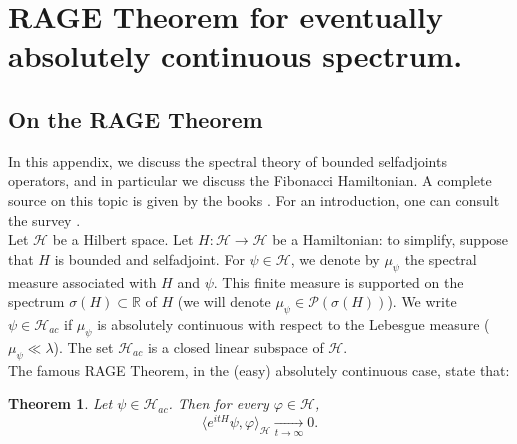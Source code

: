 \documentclass[a4paper]{article}
\newtheorem{theorem}{Theorem}[section]
\theoremstyle{definition}
\begin{document}
\section{RAGE Theorem for eventually absolutely continuous spectrum.}\label{ap:D}



\subsection{On the RAGE Theorem}

In this appendix, we discuss the spectral theory of bounded selfadjoints operators, and in particular we discuss the Fibonacci Hamiltonian. A complete source on this topic is given by the books \cite{DF22,DF24}. For an introduction, one can consult the survey \cite{Da17}. \\

Let $\mathcal{H}$ be a Hilbert space. Let $H : \mathcal{H} \rightarrow \mathcal{H}$ be a Hamiltonian: to simplify, suppose that $H$ is bounded and selfadjoint. For $\psi \in \mathcal{H}$, we denote by $\mu_\psi$ the spectral measure associated with $H$ and $\psi$. This finite measure is supported on the spectrum $\sigma(H) \subset \mathbb{R}$ of $H$ (we will denote $\mu_\psi \in \mathcal{P}(\sigma(H))$). We write $\psi \in \mathcal{H}_{ac}$ if $\mu_\psi $ is absolutely continuous with respect to the Lebesgue measure ($\mu_\psi \ll \lambda$). The set $\mathcal{H}_{ac}$ is a closed linear subspace of $\mathcal{H}$. \\

The famous RAGE Theorem, in the (easy) absolutely continuous case, state that:

\begin{theorem}
Let $\psi \in \mathcal{H}_{ac}$. Then for every $\varphi \in \mathcal{H}$, $$ \langle e^{it H} \psi , \varphi \rangle_{\mathcal{H}} \underset{t \rightarrow \infty}{\longrightarrow} 0.$$
\end{theorem}
\end{document}
